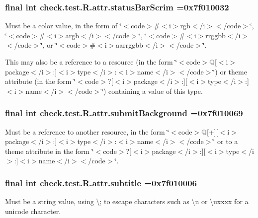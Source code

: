 \subsubsection[{status\+Bar\+Scrim}]{\setlength{\rightskip}{0pt plus 5cm}final int check.\+test.\+R.\+attr.\+status\+Bar\+Scrim =0x7f010032\hspace{0.3cm}{\ttfamily [static]}}\label{classcheck_1_1test_1_1_r_1_1attr_a6c4449ac97eb2616059433f47cbaeb84}
Must be a color value, in the form of \char`\"{}$<$code$>$\#$<$i$>$rgb$<$/i$>$$<$/code$>$\char`\"{}, \char`\"{}$<$code$>$\#$<$i$>$argb$<$/i$>$$<$/code$>$\char`\"{}, \char`\"{}$<$code$>$\#$<$i$>$rrggbb$<$/i$>$$<$/code$>$\char`\"{}, or \char`\"{}$<$code$>$\#$<$i$>$aarrggbb$<$/i$>$$<$/code$>$\char`\"{}. 

This may also be a reference to a resource (in the form \char`\"{}$<$code$>$@\mbox{[}$<$i$>$package$<$/i$>$\+:\mbox{]}$<$i$>$type$<$/i$>$\+:$<$i$>$name$<$/i$>$$<$/code$>$\char`\"{}) or theme attribute (in the form \char`\"{}$<$code$>$?\mbox{[}$<$i$>$package$<$/i$>$\+:\mbox{]}\mbox{[}$<$i$>$type$<$/i$>$\+:\mbox{]}$<$i$>$name$<$/i$>$$<$/code$>$\char`\"{}) containing a value of this type. \hypertarget{classcheck_1_1test_1_1_r_1_1attr_a5fe58849f07f3b5684db0abc31d73d52}{}
\subsubsection[{submit\+Background}]{\setlength{\rightskip}{0pt plus 5cm}final int check.\+test.\+R.\+attr.\+submit\+Background =0x7f010069\hspace{0.3cm}{\ttfamily [static]}}\label{classcheck_1_1test_1_1_r_1_1attr_a5fe58849f07f3b5684db0abc31d73d52}
Must be a reference to another resource, in the form \char`\"{}$<$code$>$@\mbox{[}+\mbox{]}\mbox{[}$<$i$>$package$<$/i$>$\+:\mbox{]}$<$i$>$type$<$/i$>$\+:$<$i$>$name$<$/i$>$$<$/code$>$\char`\"{} or to a theme attribute in the form \char`\"{}$<$code$>$?\mbox{[}$<$i$>$package$<$/i$>$\+:\mbox{]}\mbox{[}$<$i$>$type$<$/i$>$\+:\mbox{]}$<$i$>$name$<$/i$>$$<$/code$>$\char`\"{}. \hypertarget{classcheck_1_1test_1_1_r_1_1attr_aba79cc7bd7219629cd636e1c463aa4af}{}
\subsubsection[{subtitle}]{\setlength{\rightskip}{0pt plus 5cm}final int check.\+test.\+R.\+attr.\+subtitle =0x7f010006\hspace{0.3cm}{\ttfamily [static]}}\label{classcheck_1_1test_1_1_r_1_1attr_aba79cc7bd7219629cd636e1c463aa4af}
Must be a string value, using \textquotesingle{}\textbackslash{};\textquotesingle{} to escape characters such as \textquotesingle{}\textbackslash{}n\textquotesingle{} or \textquotesingle{}\textbackslash{}uxxxx\textquotesingle{} for a unicode character. 

